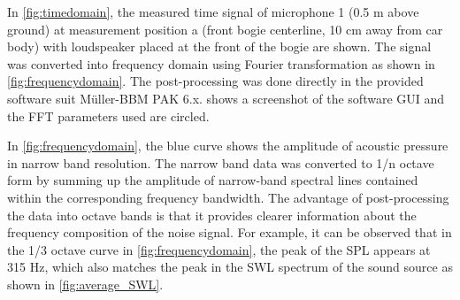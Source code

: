 In \cref{fig:timedomain}, the measured time signal of microphone 1 (0.5 m above ground) at measurement position a (front bogie centerline, 10 cm away from car body) with loudspeaker placed at the front of the bogie are shown. The signal was converted into frequency domain using Fourier transformation as shown in \cref{fig:frequencydomain}. The post-processing was done directly in the provided software suit Müller-BBM PAK 6.x.  shows a screenshot of the software GUI and the FFT parameters used are circled.

In \cref{fig:frequencydomain}, the blue curve shows the amplitude of acoustic pressure in narrow band resolution. The narrow band data was converted to 1/n octave form by summing up the amplitude of narrow-band spectral lines contained within the corresponding frequency bandwidth. The advantage of post-processing the data into octave bands is that it provides clearer information about the frequency composition of the noise signal. For example, it can be observed that in the 1/3 octave curve in \cref{fig:frequencydomain}, the peak of the SPL appears at 315 Hz, which also matches the peak in the SWL spectrum of the sound source as shown in \cref{fig:average_SWL}.

